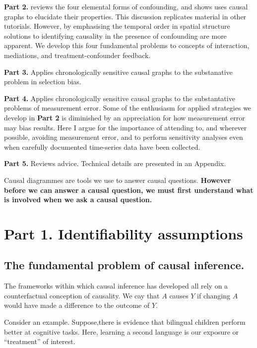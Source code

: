 \documentclass[
  singlecolumn]{report}
\begin{document}
\textbf{Part 2.} reviews the four elemental forms of confounding, and
shows uses causal graphs to elucidate their properties. This discussion
replicates material in other tutorials. However, by emphasising the
temporal order in spatial structure solutions to identifying causality
in the presence of confounding are more apparent. We develop this four
fundamental problems to concepts of interaction, mediations, and
treatment-confounder feedback.

\textbf{Part 3.} Applies chronologically sensitive causal graphs to the
substanative problem in selection bias.

\textbf{Part 4.} Applies chronologically sensitive causal graphs to the
substantative problems of measurement error. Some of the enthusiasm for
applied strategies we develop in \textbf{Part 2} is diminished by an
appreciation for how measurement error may bias results. Here I argue
for the importance of attending to, and wherever possible, avoiding
measurement error, and to perform sensitivity analyses even when
carefully documented time-series data have been collected.

\textbf{Part 5.} Reviews advice. Technical details are presented in an
Appendix.

Causal diagrammes are tools we use to answer causal questions.
\textbf{However before we can answer a causal question, we must first
understand what is involved when we ask a causal question.}

\hypertarget{part-1.-identifiability-assumptions}{%
\section{Part 1. Identifiability
assumptions}\label{part-1.-identifiability-assumptions}}

\hypertarget{the-fundamental-problem-of-causal-inference.}{%
\subsection{The fundamental problem of causal
inference.}\label{the-fundamental-problem-of-causal-inference.}}

The frameworks within which causal inference has developed all rely on a
counterfactual conception of causality. We cay that \(A\) causes \(Y\)
if changing \(A\) would have made a difference to the outcome of \(Y\).

Consider an example. Suppose,there is evidence that bilingual children
perform better at cognitive tasks. Here, learning a second language is
our exposure or ``treatment'' of interest.
\end{document}

